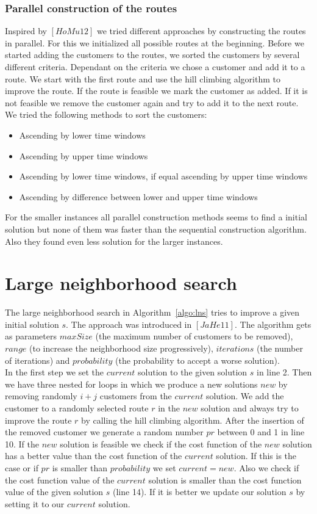 \documentclass[fleqn]{scrartcl}
\begin{document}
\subsubsection{Parallel construction of the routes}
Inspired by $[HoMu 12]$ we tried different approaches by constructing the routes in parallel. For this we initialized all possible routes at the beginning. Before we started adding the customers to the routes, we sorted the customers by several different criteria. Dependant on the criteria we chose a customer and add it to a route. We start with the first route and use the hill climbing algorithm to improve the route. If the route is feasible we mark the customer as added. If it is not feasible we remove the customer again and try to add it to the next route.
We tried the following methods to sort the customers:
\begin{itemize}
\item Ascending by lower time windows
\item Ascending by upper time windows
\item Ascending by lower time windows, if equal ascending by upper time windows
\item Ascending by difference between lower and upper time windows
\end{itemize}
For the smaller instances all parallel construction methods seems to find a initial solution but none of them was faster than the sequential construction algorithm. Also they found even less solution for the larger instances.

\newpage
\section{Large neighborhood search}
The large neighborhood search in Algorithm~\ref{algo:lns} tries to improve a given initial solution $s$. The approach was introduced in $[JaHe 11]$. The algorithm gets as parameters $maxSize$ (the maximum number of customers to be removed), $range$ (to increase the neighborhood size progressively), $iterations$ (the number of iterations) and $probability$ (the probability to accept a worse solution).\\
In the first step we set the  $current$ solution to the given solution $s$ in line 2. Then we have three nested for loops in which we produce a new solutions $new$ by removing randomly $i+j$ customers from the $current$ solution. We add the customer to a randomly selected route $r$ in the $new$ solution and always try to improve the route $r$ by calling the hill climbing algorithm. After the insertion of the removed customer we generate a random number $pr$ between 0 and 1 in line 10. If the $new$ solution is feasible we check if the cost function of the $new$ solution has a better value than the cost function of the $current$ solution. If this is the case or if $pr$ is smaller than $probability$ we set $current = new$. Also we check if the cost function value of the $current$ solution is smaller than the cost function value of the given solution $s$ (line 14). If it is better we update our solution $s$ by setting it to our $current$ solution.
 
\end{document}
